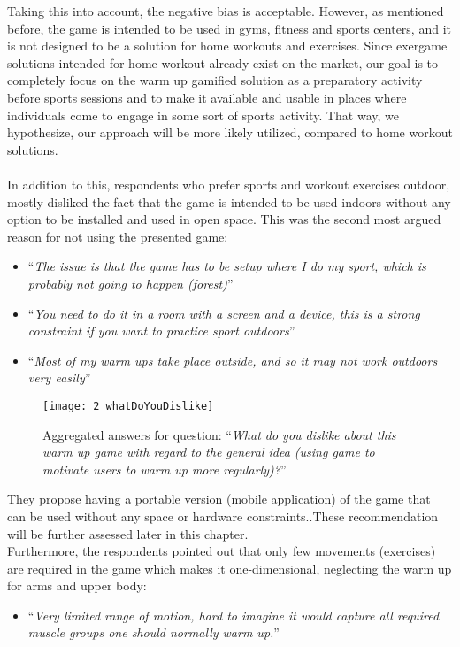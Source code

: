 Taking this into account, the negative bias is acceptable. However, as mentioned before, the game is intended to be used in gyms, fitness and sports centers, and it is not designed to be a solution for home workouts and exercises. Since exergame solutions intended for home workout already exist on the market, our goal is to completely focus on the warm up gamified solution as a preparatory activity before sports sessions and to make it available and usable in places where individuals come to engage in some sort of sports activity. That way, we hypothesize, our approach will be more likely utilized, compared to home workout solutions. \\\\In addition to this, respondents who prefer sports and workout exercises outdoor, mostly disliked the fact that the game is intended to be used indoors without any option to be installed and used in open space. This was the second most argued reason for not using the presented game:
\begin{itemize}
\item ``\textit{The issue is that the game has to be setup where I do my sport, which is probably not going to happen (forest)}''
\item ``\textit{You need to do it in a room with a screen and a device, this is a strong constraint if you want to practice sport outdoors}''
\item ``\textit{Most of my warm ups take place outside, and so it may not work outdoors very easily}''
\end{itemize}
\begin{figure}[h]
    \centering
    \texttt{[image: 2\_whatDoYouDislike]}
    \caption[Results for most disliked features of the exergame.]{Aggregated answers for question: ``\textit{What do you dislike about this warm up game with regard to the general idea (using game to motivate users to warm up more regularly)?}''}
    \label{fig:2_whatDoYouDislike}
\end{figure}
They propose having a portable version (mobile application) of the game that can be used without any space or hardware constraints..These recommendation will be further assessed later in this chapter.\\ Furthermore, the respondents pointed out that only few movements (exercises) are required in the game which makes it one-dimensional, neglecting the warm up for arms and upper body:
\begin{itemize}
\item ``\textit{Very limited range of motion, hard to imagine it would capture all required muscle groups one should normally warm up.}''
\end{itemize}
